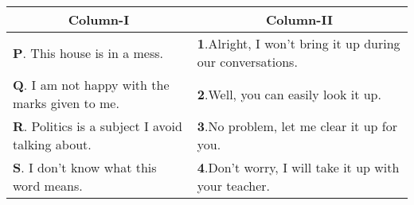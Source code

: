 \begin{center}
\begin{tabular}{|l|l|}
\hline
\multicolumn{1}{|c|}{Column-I} & \multicolumn{1}{|c|}{Column-II} \\
\hline
\textbf{P}. This house is in a mess. & \textbf{1}.Alright, I won't bring it up during our conversations. \\
\hline
\textbf{Q}. I am not happy with the marks given to me. & \textbf{2}.Well, you can easily look it up. \\
\hline
\textbf{R}. Politics is a subject I avoid talking about. & \textbf{3}.No problem, let me clear it up for you. \\
\hline
\textbf{S}. I don't know what this word means. & \textbf{4}.Don't worry, I will take it up with your teacher. \\
\hline
\end{tabular}
\end{center}